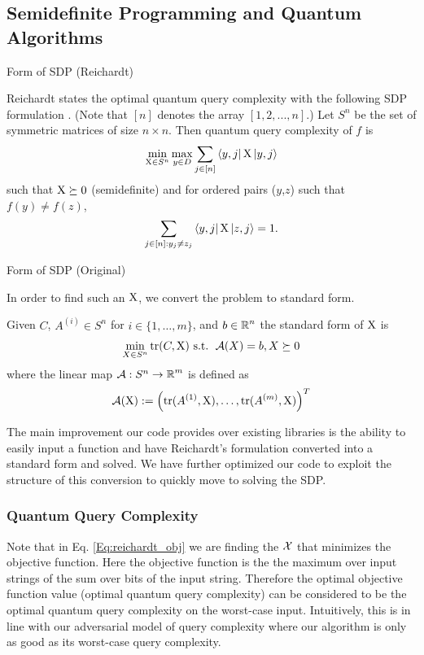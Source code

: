 \subsection{Semidefinite Programming and Quantum Algorithms}

Form of SDP (Reichardt)

Reichardt states the optimal quantum query complexity with the
following SDP formulation \cite{reichardt2009span}.
(Note that $[n]$ denotes the array
$[1,2,...,n]$.)
Let $S^n$ be the set of symmetric matrices of size $n \times n$.
Then quantum query complexity of $f$ is
\begin{align} \label{Eq:reichardt_obj} 
    \min_{\operatorname{X} \in S^n} \max_{y \in D} \sum_{j \in [n]} \bra{y,j}\operatorname{X}\ket{y,j} 
\end{align}
such that $\operatorname{X} \succeq 0$ (semidefinite)
and for ordered pairs ($y$,$z$) such that $f(y) \neq f(z)$,
\begin{align}\label{Eq:reichardt_F0}
    \sum_{j \in [n]: y_j \ne z_j} 
    \bra{y,j} \operatorname{X} \ket{z, j} = 1.
\end{align}

Form of SDP (Original)

In order to find such an $\operatorname{X}$, we convert the problem to standard
form.

Given $C$, $A^{(i)} \in S^n$ for $i \in \{1,\dots,m\}$, and $b \in \operatorname{\mathbb{R}}^n$
the standard form of $\operatorname{X}$ is
\begin{align} \label{Eq:standard}
    \min_{X \in S^n} \operatorname{\text{tr}} (C, \operatorname{X}) \textrm{ s.t. }
    \operatorname{\mathcal{A}}(X) = b, X \succeq 0
\end{align}
where the linear map $\operatorname{\mathcal{A}}: S^n \rightarrow \operatorname{\mathbb{R}}^m$ is defined as
\begin{align}
    \operatorname{\mathcal{A}}(\operatorname{X}) := \left( \operatorname{\text{tr}}(A^{(1)}, \operatorname{X}), \dots, \operatorname{\text{tr}}(A^{(m)}, \operatorname{X}) \right)^T
    \nonumber
\end{align}

The main improvement our code provides over existing libraries is the ability 
to easily input a function and have Reichardt's formulation converted into a standard 
form and solved. We have further optimized our code to exploit the 
structure of this conversion to quickly move to solving the SDP.


\subsubsection{Quantum Query Complexity}

Note that in Eq. \ref{Eq:reichardt_obj} we are finding the 
$\operatorname{\mathcal{X}}$ that minimizes the objective function. Here 
the objective function is the the maximum over input strings 
of the sum over bits of the input string. 
Therefore the optimal objective function value 
(optimal quantum query complexity) can be considered to 
be the optimal quantum query complexity on the worst-case input. 
Intuitively, this is in line with our adversarial model of 
query complexity where our algorithm is only as good 
as its worst-case query complexity.

